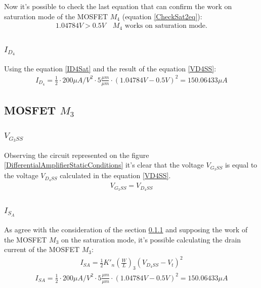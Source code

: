\documentclass[10pt,a4paper]{book}
\begin{document}
Now it's possible to check the last equation that can confirm the work on saturation mode of the MOSFET $M_4$ (equation \ref{CheckSat2eq}):
\begin{align}
1.04784V > 0.5V \quad M_4 \text{ works on saturation mode.} \label{M4SatConfirm}
\end{align}

\subsubsection{$I_{D_4}$}
Using the equation \ref{ID4Sat} and the result of the equation \ref{VD4SS}:
\begin{align}
I_{D_4} = \frac{1}{2}\cdot 200 \mu A/V^2\cdot 5 \frac{\mu m}{\mu m} \cdot \left(1.04784V -0.5V \right)^2 = 150.06433 \mu A \label{ID4SatResult}
\end{align}

\subsection{MOSFET $M_3$}
\subsubsection{$V_{G_3SS}$}\label{VG3SS}
Observing the circuit represented on the figure \ref{DifferentialAmplifierStaticConditions} it's clear that the voltage $V_{G_3SS}$  is equal to the voltage $V_{D_4SS}$ calculated in the equation \ref{VD4SS}.
\begin{align}
V_{G_3SS} = V_{D_4SS}
\end{align}

\subsubsection{$I_{S_A}$}
As agree with the consideration of the section \ref{VG3SS} and supposing the work of the MOSFET $M_3$ on the saturation mode, it's possible calculating the drain current of the MOSFET $M_3$:\\

\begin{align}
I_{SA} = \frac{1}{2}{K'}_n \left(\frac{W}{L}\right)_3 (V_{D_4SS} - V_t)^2
\end{align}
\begin{align}
I_{SA} = \frac{1}{2}\cdot 200 \mu A/V^2\cdot 5 \frac{\mu m}{\mu m} \cdot \left(1.04784V -0.5V \right)^2 = 150.06433 \mu A \label{ISASat}
\end{align}
\end{document}
